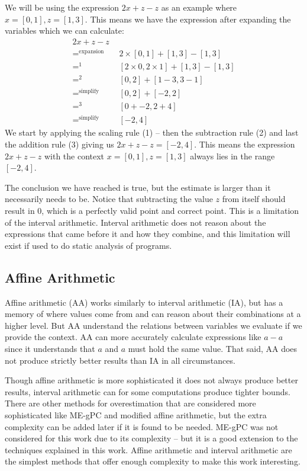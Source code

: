 We will be using the expression $2x + z - z$ as an example where $x = [0, 1], z = [1, 3]$. This means we have the expression after expanding the variables which we can calculate:
\begin{align*}
  2x + z - z \\
  =^{\text{expansion}} \quad & 2 \times [0, 1] + [1, 3] - [1, 3] \\
  =^{1}                \quad & [2 \times 0, 2 \times 1] + [1, 3] - [1, 3] \\
  =^{2}                \quad & [0, 2] + [1 - 3, 3 - 1] \\
  =^{\text{simplify}}  \quad & [0, 2] + [-2, 2] \\
  =^{3}                \quad & [0 + -2, 2 + 4] \\
  =^{\text{simplify}}  \quad & [-2, 4]
\end{align*}
We start by applying the scaling rule (1) -- then the subtraction rule (2) and last the addition rule (3) giving us $2x + z - z = [-2, 4]$. This means the expression $2x + z - z$ with the context $x = [0, 1], z = [1, 3]$ always lies in the range $[-2, 4]$.
\label{sec:prevResultIA}

The conclusion we have reached is true, but the estimate is larger than it necessarily needs to be. Notice that subtracting the value $z$ from itself should result in $0$, which is a perfectly valid point and correct point. This is a limitation of the interval arithmetic. Interval arithmetic does not reason about the expressions that came before it and how they combine, and this limitation will exist if used to do static analysis of programs. 

\subsection{Affine Arithmetic}
Affine arithmetic (AA) works similarly to interval arithmetic (IA), but has a memory of where values come from and can reason about their combinations at a higher level. But AA understand the relations between variables we evaluate if we provide the context. AA can more accurately calculate expressions like $a - a$ since it understands that $a$ and $a$ must hold the same value. That said, AA does not produce strictly better results than IA in all circumstances.\cite{src:affAri}

Though affine arithmetic is more sophisticated it does not always produce better results, interval arithmetic can for some computations produce tighter bounds. There are other methods for overestimation that are considered more sophisticated like ME-gPC \cite{src:MEgPC} and modified affine arithmetic, but the extra complexity can be added later if it is found to be needed. ME-gPC was not considered for this work due to its complexity -- but it is a good extension to the techniques explained in this work. Affine arithmetic and interval arithmetic are the simplest methods that offer enough complexity to make this work interesting.

